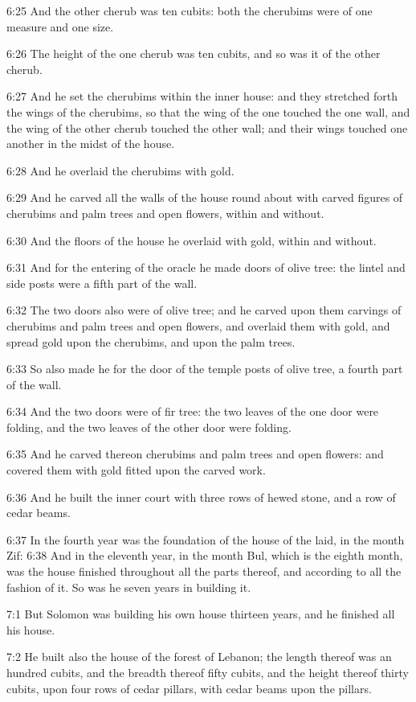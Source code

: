 6:25 And the other cherub was ten cubits: both the cherubims were of one measure and one size.

6:26 The height of the one cherub was ten cubits, and so was it of the other cherub.

6:27 And he set the cherubims within the inner house: and they stretched forth the wings of the cherubims, so that the wing of the one touched the one wall, and the wing of the other cherub touched the other wall; and their wings touched one another in the midst of the house.

6:28 And he overlaid the cherubims with gold.

6:29 And he carved all the walls of the house round about with carved figures of cherubims and palm trees and open flowers, within and without.

6:30 And the floors of the house he overlaid with gold, within and without.

6:31 And for the entering of the oracle he made doors of olive tree: the lintel and side posts were a fifth part of the wall.

6:32 The two doors also were of olive tree; and he carved upon them carvings of cherubims and palm trees and open flowers, and overlaid them with gold, and spread gold upon the cherubims, and upon the palm trees.

6:33 So also made he for the door of the temple posts of olive tree, a fourth part of the wall.

6:34 And the two doors were of fir tree: the two leaves of the one door were folding, and the two leaves of the other door were folding.

6:35 And he carved thereon cherubims and palm trees and open flowers: and covered them with gold fitted upon the carved work.

6:36 And he built the inner court with three rows of hewed stone, and a row of cedar beams.

6:37 In the fourth year was the foundation of the house of the \LORD laid, in the month Zif: 6:38 And in the eleventh year, in the month Bul, which is the eighth month, was the house finished throughout all the parts thereof, and according to all the fashion of it. So was he seven years in building it.

7:1 But Solomon was building his own house thirteen years, and he finished all his house.

7:2 He built also the house of the forest of Lebanon; the length thereof was an hundred cubits, and the breadth thereof fifty cubits, and the height thereof thirty cubits, upon four rows of cedar pillars, with cedar beams upon the pillars.


